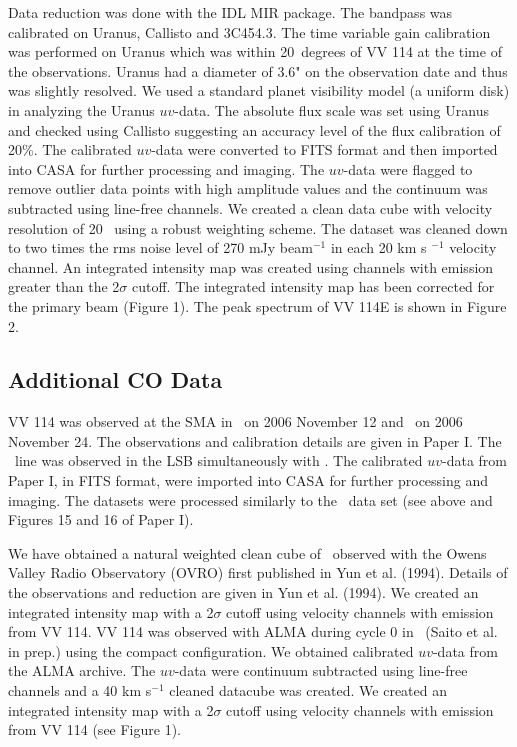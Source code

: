 Data reduction was done with the IDL MIR package. The bandpass was calibrated on Uranus, Callisto and 3C454.3.  The time variable gain calibration was performed on Uranus which was within 20~degrees of VV 114 at the time of the observations. Uranus had a diameter of 3.6" on the observation date and thus was slightly resolved. We used a standard planet visibility model (a uniform disk) in analyzing the Uranus $uv$-data. The absolute flux scale was set using Uranus and checked using Callisto suggesting an accuracy level of the flux calibration of 20\%. The calibrated $uv$-data were converted to FITS format and then imported into CASA for further processing and imaging. The $uv$-data were flagged to remove outlier data points with high amplitude values and the  continuum was subtracted using line-free channels. We created a clean data cube with velocity resolution of 20 \kms\ using a robust weighting scheme. The dataset was cleaned down to two times the rms noise level of 270 mJy beam$^{-1}$ in each 20 km s $^{-1}$ velocity channel. An integrated intensity map was created using channels with emission greater than the 2$\sigma$ cutoff. The integrated intensity map has been corrected for the primary beam (Figure 1). The peak spectrum of VV 114E is shown in Figure 2. 

\subsection{Additional CO Data}%
VV 114 was observed at the SMA in \cothree\ on 2006 November 12 and \cotwo\ on 2006 November 24. The observations and calibration details are given in Paper I. The \tcotwo\ line was observed in the LSB simultaneously with \cotwo. The calibrated $uv$-data from Paper I, in FITS format, were imported into CASA for further processing and imaging. The datasets were processed similarly to the \cosix\ data set (see above and Figures 15 and 16 of Paper I). 

We have obtained a natural weighted clean cube of \coone\ observed with the Owens Valley Radio Observatory (OVRO) first published in Yun et al. (1994). Details of the observations and reduction are given in Yun et al. (1994). We created an integrated intensity map with a 2$\sigma$ cutoff using velocity channels with emission from VV 114. 
VV 114 was observed with ALMA during cycle 0 in \tcoone\ (Saito et al. in prep.) using the compact configuration. We obtained calibrated $uv$-data from the ALMA archive. The $uv$-data were continuum subtracted using line-free channels and a 40 km s$^{-1}$ cleaned datacube was created. We created an integrated intensity map with a 2$\sigma$ cutoff using velocity channels with emission from VV 114 (see Figure 1). 

